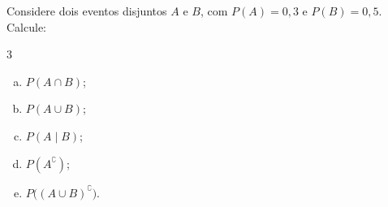%
%


\begin{exercicioBanco}[\valorquestao]
Considere dois eventos disjuntos \(A\) e \(B\), com \(P(A) = 0,3\) e \(P(B) = 0,5\). Calcule:
%
\begin{multicols}{3}
    \begin{enumerate}[(a)]
        \item \(P(A \cap B)\);
        \item \(P(A \cup B)\);
        \item \(P(A \mid B)\);
        \item \(P(A^{\complement})\);
        \item \(P\big((A \cup B)^{\complement}\big)\).
    \end{enumerate}
\end{multicols}
%
\end{exercicioBanco}

